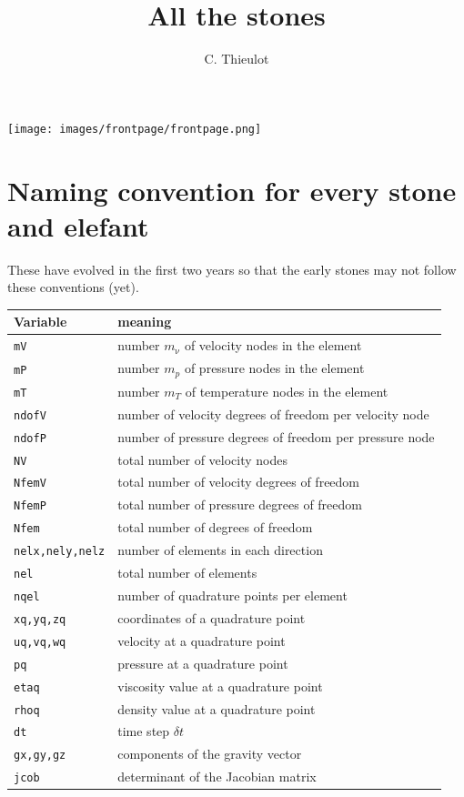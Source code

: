 \documentclass[a4paper,11pt]{report}
\author{C. Thieulot}
\title{All the stones}
\begin{document}
\thispagestyle{empty}
\texttt{[image: images/frontpage/frontpage.png]}

\maketitle
\tableofcontents

\chapter*{Naming convention for every stone and elefant }

These have evolved in the first two years so that the early stones may not 
follow these conventions (yet).

\begin{tabular}{p{2.5cm}p{14cm}}
\hline
Variable & meaning \\
\hline
\hline
{\tt mV}    & number $m_\upnu$ of velocity nodes in the element \\
{\tt mP}    & number $m_p$ of pressure nodes in the element \\
{\tt mT}    & number $m_T$ of temperature nodes in the element \\
{\tt ndofV} & number of velocity degrees of freedom per velocity node \\
{\tt ndofP} & number of pressure degrees of freedom per pressure node \\
{\tt NV}    & total number of velocity nodes \\
{\tt NfemV} & total number of velocity degrees of freedom \\
{\tt NfemP} & total number of pressure degrees of freedom \\
{\tt Nfem}  & total number of degrees of freedom \\
{\tt nelx,nely,nelz} & number of elements in each direction \\
{\tt nel}   & total number of elements \\
{\tt nqel}  & number of quadrature points per element \\
{\tt xq,yq,zq} & coordinates of a quadrature point \\
{\tt uq,vq,wq} & velocity at a quadrature point \\
{\tt pq}   & pressure at a quadrature point \\
{\tt etaq} & viscosity value at a quadrature point \\
{\tt rhoq} & density value at a quadrature point \\
{\tt dt}   & time step $\delta t$\\ 
{\tt gx,gy,gz} & components of the gravity vector \\
{\tt jcob} & determinant of the Jacobian matrix \\
\hline
\end{tabular}
\end{document}
